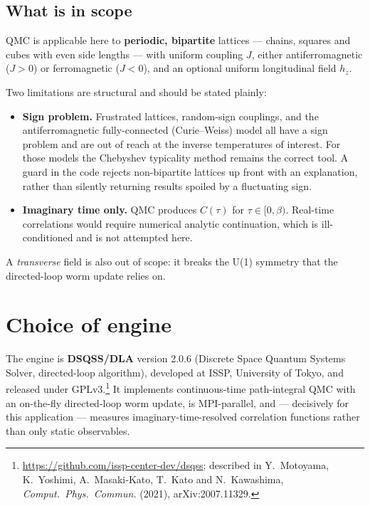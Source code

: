 \documentclass[11pt,a4paper]{article}
\begin{document}
\subsection{What is in scope}

QMC is applicable here to \textbf{periodic, bipartite} lattices --- chains,
squares and cubes with even side lengths --- with uniform coupling $J$, either
antiferromagnetic ($J>0$) or ferromagnetic ($J<0$), and an optional uniform
longitudinal field $h_z$.

Two limitations are structural and should be stated plainly:

\begin{itemize}
  \item \textbf{Sign problem.} Frustrated lattices, random-sign couplings, and
    the antiferromagnetic fully-connected (Curie--Weiss) model all have a sign
    problem and are out of reach at the inverse temperatures of interest. For
    those models the Chebyshev typicality method remains the correct tool. A
    guard in the code rejects non-bipartite lattices up front with an
    explanation, rather than silently returning results spoiled by a
    fluctuating sign.
  \item \textbf{Imaginary time only.} QMC produces $C(\tau)$ for
    $\tau\in[0,\beta)$. Real-time correlations would require numerical analytic
    continuation, which is ill-conditioned and is not attempted here.
\end{itemize}

A \emph{transverse} field is also out of scope: it breaks the U(1) symmetry that
the directed-loop worm update relies on.

\section{Choice of engine}

The engine is \textbf{DSQSS/DLA} version 2.0.6 (Discrete Space Quantum Systems
Solver, directed-loop algorithm), developed at ISSP, University of Tokyo, and
released under GPLv3.\footnote{%
\url{https://github.com/issp-center-dev/dsqss}; described in Y.~Motoyama,
K.~Yoshimi, A.~Masaki-Kato, T.~Kato and N.~Kawashima,
\emph{Comput.\ Phys.\ Commun.} (2021), arXiv:2007.11329.}
It implements continuous-time path-integral QMC with an on-the-fly directed-loop
worm update, is MPI-parallel, and --- decisively for this application ---
measures imaginary-time-resolved correlation functions rather than only static
observables.
\end{document}
